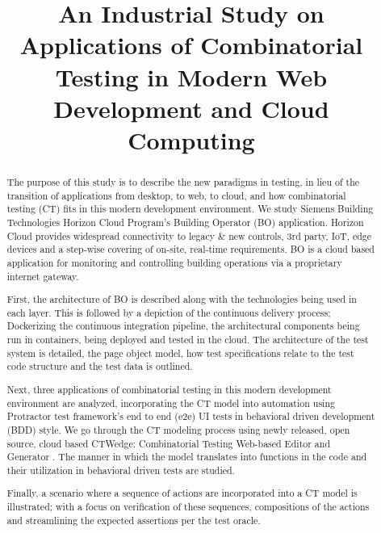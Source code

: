 \documentclass[conference]{IEEEtran}
\begin{document}
\title{An Industrial Study on Applications of Combinatorial Testing in Modern Web Development and Cloud Computing}


\author{
}

\maketitle


\begin{abstract}
The purpose of this study is to describe the new paradigms in testing,
in lieu of the transition of applications from desktop, to web, to cloud, and how combinatorial testing (CT) fits in this modern development environment. 
We study Siemens Building Technologies Horizon Cloud Program's Building Operator (BO) application.
Horizon Cloud provides widespread connectivity to legacy \& new controls, 3rd party, IoT, edge devices and a step-wise covering of on-site, real-time requirements. 
BO is a cloud based application for monitoring and controlling building operations via a proprietary internet gateway.

First, the architecture of BO is described along with the technologies being used in each layer. 
This is followed by a depiction of the continuous delivery process; Dockerizing \cite{wiki:docker} the continuous integration pipeline,
the architectural components being run in containers, being deployed and tested in the cloud. 
The architecture of the test system is detailed, the page object model, how test specifications relate to the test code structure and the test data is outlined. 

Next, three applications of combinatorial testing in this modern development environment are analyzed,
incorporating the CT model into automation using Protractor test framework's end to end (e2e) UI tests in behavioral driven development (BDD) style. 
We go through the CT modeling process using newly released, open source, cloud based CTWedge: Combinatorial Testing Web-based Editor and Generator \cite{gargantini2018migrating}. 
The manner in which the model translates into functions in the code and their utilization in behavioral driven tests are studied.

Finally, a scenario where a sequence of actions are incorporated into a CT model is illustrated;
with a focus on verification of these sequences, compositions of the actions and streamlining the expected assertions per the test oracle.

\end{abstract}
\end{document}
